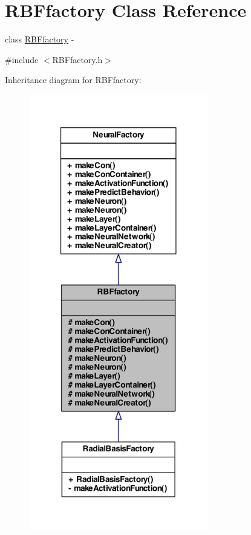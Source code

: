 \hypertarget{class_r_b_ffactory}{
\section{RBFfactory Class Reference}
\label{class_r_b_ffactory}
}


class \hyperlink{class_r_b_ffactory}{RBFfactory} -\/  




{\ttfamily \#include $<$RBFfactory.h$>$}



Inheritance diagram for RBFfactory:\nopagebreak
\begin{figure}[H]
\begin{center}
\leavevmode
\includegraphics[width=222pt]{class_r_b_ffactory__inherit__graph}
\end{center}
\end{figure}


